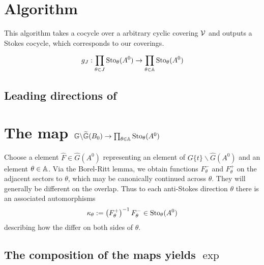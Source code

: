 \section{Algorithm~\cite[II.3.4]{Loday1994}}
This algorithm takes a cocycle over a arbitrary cyclic covering $\mathcal{V}$ and
outputs a Stokes cocycle, which corresponds to our coverings.
\begin{comment}
  \begin{defn}
    \marginnote{\cite[Def.II.1.8]{Loday1994}}
    \rewrite{A cocycle $\dot\phi=(\dot\phi_j)_{j\in J}$ on a cyclic covering
      $\cU=(U_j)_{j\in J}$ is said to be a \emph{Stokes cocycle} when the
      components $\dot\phi_j$, if non trivial, represent Stokes germs
      $\dot\phi_{j,\theta_j}\in\Sto_{\theta_j}(A^0$ at anti-Stokes directions
      $\theta_j$ in a cyclic ascending ordering.}
  \end{defn}
\end{comment}
\[
  g_J:\prod_{\theta\in J}\operatorname{Sto}_\theta(A^0)\to\prod_{\theta\in\mathbb{A}}\operatorname{Sto}_\theta(A^0)
\]

\subsection{Leading directions of \TODO[\dots]}
\begin{comment}
  See \cite[863ff]{Loday1994}
\end{comment}

\section{The map
  $\mathbb{G}\backslash\widetilde{\mathbb{G}}(B_0)\to\prod_{\theta\in\mathbb{A}}\operatorname{Sto}_\theta(A^0)$}
\begin{comment}
  see \cite[9f]{thboalch} and \cite[III.2.1]{Loday1994}
\end{comment}

\begin{paracol}{2}\sloppy
\switchcolumn[0]\noindent
  \begin{comment}
    see \cite[9f]{thboalch}
  \end{comment}
  Choose a element $\hat F\in\hat G(A^0)$ representing an element of
  $G\{t\}\backslash\hat G(A^0)$ and an element $\theta\in\mathbb{A}$.
  Via the Borel-Ritt lemma, we obtain functions $F_\theta^-$ and $F_\theta^+$ on
  the adjacent sectors to $\theta$, which may be canonically continued across
  $\theta$. They will generally be different on the overlap. Thus to each
  anti-Stokes direction $\theta$ there is an associated automorphisms
  \[
    \kappa_\theta:=\left(F_\theta^+\right)^{-1}F_\theta^-
    \in\operatorname{Sto}_\theta(A^0)
  \]
  describing how the \TODO{} differ on both sides of $\theta$.
\switchcolumn[1]\noindent
  \begin{comment}
    see \cite[III.2.1]{Loday1994}
  \end{comment}
\end{paracol}
\subsection{The composition of the maps yields $\exp$}
